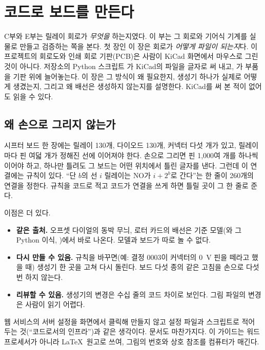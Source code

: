 \chapter{코드로 보드를 만든다}\label{ch:boardgen}

C부와 E부는 릴레이 회로가 \emph{무엇을} 하는지였다. 이 부는 그 회로와 기어식 기계를 실물로 만들고 검증하는 쪽을
본다. 첫 장인 이 장은 회로가 \emph{어떻게 파일이 되는지}다. 이 프로젝트의
회로도와 인쇄 회로 기판(PCB)은 사람이 KiCad 화면에서 마우스로 그린 것이 아니다. 저장소의 Python 스크립트
가 KiCad의 파일을 글자로 써 내고, 가 부품을 기판 위에 늘어놓는다. 이 장은 그
방식이 왜 필요한지, 생성기 하나가 실제로 어떻게 생겼는지, 그리고 왜 배선은 생성하지 않는지를 설명한다.
KiCad를 써 본 적이 없어도 읽을 수 있다.

\section{왜 손으로 그리지 않는가}\label{sec:gen-why}

\Why 시프터 보드 한 장에는 릴레이 130개, 다이오드 130개, 커넥터 다섯 개가 있고, 릴레이마다 핀 여덟 개가
정해진 선에 이어져야 한다. 손으로 그리면 핀 1,000여 개를 하나씩 이어야 하고, 하나만 틀려도 그 보드는 어떤
위치에서 틀린 글자를 낸다. 그런데 이 연결에는 규칙이 있다. ``단 $b$의 선 $i$ 릴레이는 NO가 $i + 2^b$로
간다''는 한 줄이 260개의 연결을 정한다. 규칙을 코드로 적고 코드가 연결을 쓰게 하면 틀릴 곳이 그 한 줄로 준다.

이점은 더 있다.
\begin{itemize}
\item \textbf{같은 출처.} 오프셋 다이얼의 동박 무늬, 로터 카드의 배선은 기준 모델(와 그 Python 이식,
)에서 바로 나온다. 모델과 보드가 따로 놀 수 없다.
\item \textbf{다시 만들 수 있음.} 규칙을 바꾸면(예: 결정 0003이 커넥터의 0~V 핀을 떼라고 했을 때) 생성기 한 곳을
고쳐 다시 돌린다. 보드 다섯 종의 같은 고침을 손으로 다섯 번 하지 않는다.
\item \textbf{리뷰할 수 있음.} 생성기의 변경은 수십 줄의 코드 차이로 보인다. 그림 파일의 변경은 사람이 읽기
어렵다.
\end{itemize}

\General 웹 서비스의 서버 설정을 화면에서 클릭해 만들지 않고 설정 파일과 스크립트로 적어 두는 것(``코드로서의
인프라'')과 같은 생각이다. 문서도 마찬가지다. 이 가이드는 워드프로세서가 아니라 \LaTeX\ 원고로 쓰여, 그림의
번호와 상호 참조를 컴퓨터가 매긴다.

